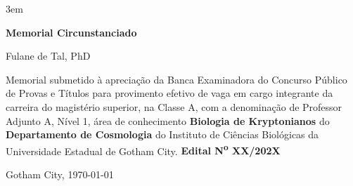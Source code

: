 \documentclass[a4paper,12pt]{article} %
\newcommand{\nomeAutor}{Fulane de Tal, PhD}
\newcommand{\nomeCidade}{Gotham City}
\newcommand{\meuTitulo}{Memorial Circunstanciado}
\begin{document}
\emergencystretch 3em
\begin{titlepage}
\setlength{\headheight}{80pt}
    \thispagestyle{fancy} %
    \fancyhf{}
 \renewcommand{\headrulewidth}{1pt} %

	\vfill
        \begin{center}
        	\vspace*{\fill}      
            {\linespread{1.5}\Huge \textbf{\meuTitulo} \par}
            

         \vfill
            {\Large \nomeAutor \par}
            
         \vfill
            \begin{flushright}
                \parbox{0.5\textwidth}{Memorial submetido à apreciação da Banca Examinadora do Concurso Público de Provas e Títulos para provimento efetivo de vaga em cargo integrante da carreira do magistério superior, na Classe A, com a denominação de Professor Adjunto A, Nível 1, área de conhecimento \textbf{Biologia de Kryptonianos} do \textbf{Departamento de Cosmologia} do Instituto de Ciências Biológicas da Universidade Estadual de Gotham City. \textbf{Edital N\textsuperscript{o} XX/202X}}
            \end{flushright}
            
            
         \vfill

            {\normalsize \nomeCidade, \today \par}
             \vfill

        \end{center}
\end{titlepage}
\end{document}
